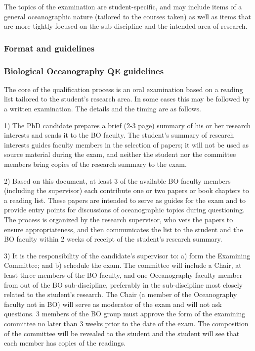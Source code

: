 \documentclass{article}
\begin{document}
The topics of the examination are student-specific, and may include items of a
general oceanographic nature (tailored to the courses taken) as well as items
that are more tightly focused on the sub-discipline and the intended area of
research.

\subsubsection{Format and guidelines}

\subsubsection{Biological Oceanography QE guidelines}

The core of the qualification process is an oral examination based on a reading
list tailored to the student’s research area. In some cases this may be
followed by a written examination. The details and the timing are as follows.

1)	The PhD candidate prepares a brief (2-3 page) summary of his or her research interests and sends it to the BO faculty. The student’s summary of research interests guides faculty members in the selection of papers; it will not be used as source material during the exam, and neither the student nor the committee members bring copies of the research summary to the exam.

2)	Based on this document, at least 3 of the available BO faculty members (including the supervisor) each contribute one or two papers or book chapters to a reading list. These papers are intended to serve as guides for the exam and to provide entry points for discussions of oceanographic topics during questioning. The process is organized by the research supervisor, who vets the papers to ensure appropriateness, and then communicates the list to the student and the BO faculty within 2 weeks of receipt of the student’s research summary.

3)	It is the responsibility of the candidate’s supervisor to: a) form the Examining Committee; and b) schedule the exam. The committee will include a Chair, at least three members of the BO faculty, and one Oceanography faculty member from out of the BO sub-discipline, preferably in the sub-discipline most closely related to the student’s research. The Chair (a member of the Oceanography faculty not in BO) will serve as moderator of the exam and will not ask questions. 3 members of the BO group must approve the form of the examining committee no later than 3 weeks prior to the date of the exam. The composition of the committee will be revealed to the student and the student will see that each member has copies of the readings.
\end{document}
